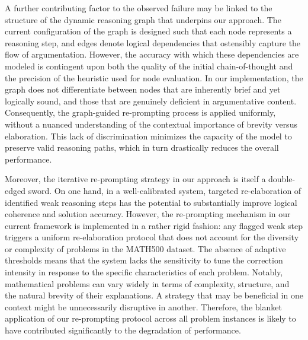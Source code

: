 \documentclass[11pt]{article}
\begin{document}
A further contributing factor to the observed failure may be linked to the structure of the dynamic reasoning graph that underpins our approach. The current configuration of the graph is designed such that each node represents a reasoning step, and edges denote logical dependencies that ostensibly capture the flow of argumentation. However, the accuracy with which these dependencies are modeled is contingent upon both the quality of the initial chain-of-thought and the precision of the heuristic used for node evaluation. In our implementation, the graph does not differentiate between nodes that are inherently brief and yet logically sound, and those that are genuinely deficient in argumentative content. Consequently, the graph-guided re-prompting process is applied uniformly, without a nuanced understanding of the contextual importance of brevity versus elaboration. This lack of discrimination minimizes the capacity of the model to preserve valid reasoning paths, which in turn drastically reduces the overall performance.

Moreover, the iterative re-prompting strategy in our approach is itself a double-edged sword. On one hand, in a well-calibrated system, targeted re-elaboration of identified weak reasoning steps has the potential to substantially improve logical coherence and solution accuracy. However, the re-prompting mechanism in our current framework is implemented in a rather rigid fashion: any flagged weak step triggers a uniform re-elaboration protocol that does not account for the diversity or complexity of problems in the MATH500 dataset. The absence of adaptive thresholds means that the system lacks the sensitivity to tune the correction intensity in response to the specific characteristics of each problem. Notably, mathematical problems can vary widely in terms of complexity, structure, and the natural brevity of their explanations. A strategy that may be beneficial in one context might be unnecessarily disruptive in another. Therefore, the blanket application of our re-prompting protocol across all problem instances is likely to have contributed significantly to the degradation of performance.
\end{document}
